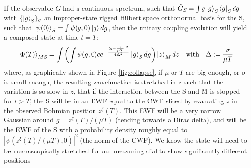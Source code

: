 \documentclass[11pt, a4paper]{article} %
\begin{document}
If the observable $G$ had a continuous spectrum, such that $\hat{G}_S=\int g\ket{g}_S\bra{g}_Sdg$ with $\{\ket{g}_S\}_g$ an improper-state rigged Hilbert space orthonormal basis for the S, such that $\ket{\psi(0)}_S=\int\psi(g,0)\ket{g}dg$, then the unitary coupling evolution will yield a composed state at time $t=T$:
\begin{equation}\label{postM2}
\ket{\Phi(T)}_{MS}=\int\qty(\int\psi(g,0) c e^{-\frac{(g-\frac{z}{\mu T})^2}{4\Delta^2}}\ket{g}_S dg)\ket{z}_Mdz\quad \text{with} \quad \Delta:=\frac{\sigma}{\mu T}
\end{equation}
where, as graphically shown in Figure \ref{fig:collapse}, if $\mu$ or $T$ are big enough, or $\sigma$ is small enough, the resulting wavefunction is stretched in $z$ such that the variation is so slow in $z$, that if the interaction between the S and M is stopped for $t>T$, the S will be in an EWF equal to the CWF sliced by evaluating $z$ in the observed Bohmian position $z^\xi(T)$. This EWF will be a very narrow Gaussian around $g=z^\xi(T)/(\mu T)$ (tending towards a Dirac delta), and will be the EWF of the S with a probability density roughly equal to $|\psi(z^\xi(T)/(\mu T),0)|^2$ (the norm of the CWF). We know the state will need to be macroscopically stretched for our measuring dial to show significantly different positions.\vspace{-0.2cm}
\end{document}
